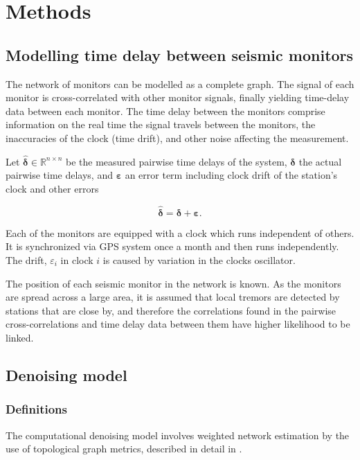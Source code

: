 \documentclass[12pt,a4paper,english]{article}
\begin{document}
\section{Methods}

\subsection{Modelling time delay between seismic monitors}
The network of monitors can be modelled as a complete graph. The signal of each monitor is cross-correlated with other monitor signals, finally yielding time-delay data between each monitor. The time delay between the monitors comprise information on the real time the signal travels between the monitors, the inaccuracies of the clock (time drift), and other noise affecting the measurement. 

Let $\bm{\hat{\delta}} \in \mathbb{R}^{n\times n}$ be the measured pairwise time delays of the system, $\bm{\delta}$ the actual pairwise time delays, and $\bm{\varepsilon}$ an error term including clock drift of the station's clock and other errors

\begin{equation}
\bm{\hat{\delta}}  = \bm{\delta} + \bm{\varepsilon}.
\label{eq:model}
\end{equation}
 
Each of the monitors are equipped with a clock which runs independent of others. It is synchronized via GPS system once a month and then runs independently. The drift, $\varepsilon_i$ in clock $i$ is caused by variation in the clocks oscillator.  

The position of each seismic monitor in the network is known. As the monitors are spread across a large area, it is assumed that local tremors are detected by stations that are close by, and therefore the correlations found in the pairwise cross-correlations and time delay data between them have higher likelihood to be linked. 

\subsection{Denoising model}\label{sec:denoising}
\subsubsection{Definitions}
The computational denoising model involves weighted network estimation by the use of topological graph metrics, described in detail in \cite{Spyrou2017}. 
\end{document}
